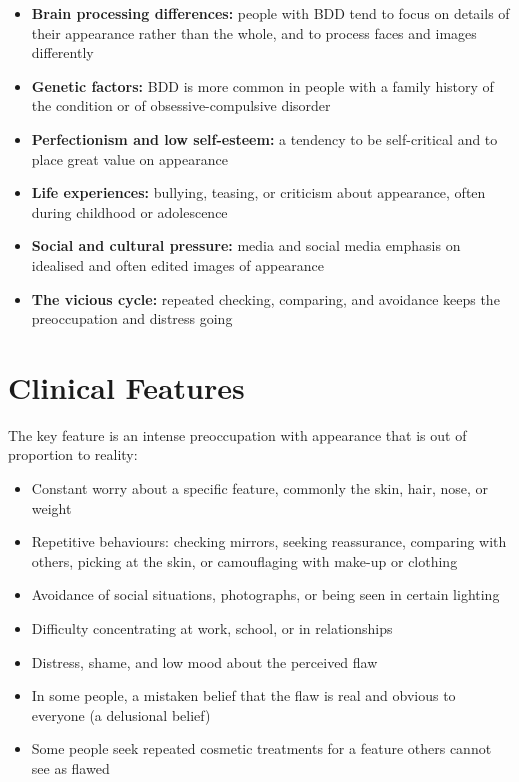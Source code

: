 \begin{itemize}
    \item \textbf{Brain processing differences:} people with BDD tend to focus on details of their appearance rather than the whole, and to process faces and images differently
    \item \textbf{Genetic factors:} BDD is more common in people with a family history of the condition or of obsessive-compulsive disorder
    \item \textbf{Perfectionism and low self-esteem:} a tendency to be self-critical and to place great value on appearance
    \item \textbf{Life experiences:} bullying, teasing, or criticism about appearance, often during childhood or adolescence
    \item \textbf{Social and cultural pressure:} media and social media emphasis on idealised and often edited images of appearance
    \item \textbf{The vicious cycle:} repeated checking, comparing, and avoidance keeps the preoccupation and distress going
\end{itemize}

\section*{Clinical Features}
The key feature is an intense preoccupation with appearance that is out of proportion to reality:

\begin{itemize}
    \item Constant worry about a specific feature, commonly the skin, hair, nose, or weight
    \item Repetitive behaviours: checking mirrors, seeking reassurance, comparing with others, picking at the skin, or camouflaging with make-up or clothing
    \item Avoidance of social situations, photographs, or being seen in certain lighting
    \item Difficulty concentrating at work, school, or in relationships
    \item Distress, shame, and low mood about the perceived flaw
    \item In some people, a mistaken belief that the flaw is real and obvious to everyone (a delusional belief)
    \item Some people seek repeated cosmetic treatments for a feature others cannot see as flawed
\end{itemize}

